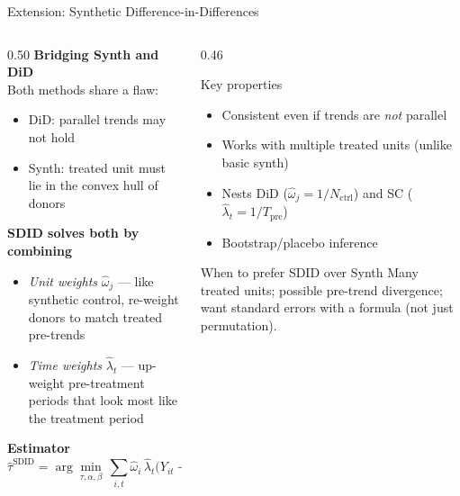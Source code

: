 \documentclass[aspectratio=169, 10pt]{beamer}
\begin{document}
\begin{frame}[shrink=10]{Extension: Synthetic Difference-in-Differences}

  \begin{columns}[T]
    \begin{column}{0.50\textwidth}
      \textbf{Bridging Synth and DiD} \citep{arkhangelsky2021}\\[4pt]
      Both methods share a flaw:
      \begin{itemize}
        \item DiD: parallel trends may not hold
        \item Synth: treated unit must lie in the convex hull of donors
      \end{itemize}

      \medskip
      \textbf{SDID solves both by combining}
      \begin{itemize}
        \item \emph{Unit weights} $\hat\omega_j$ — like synthetic control,
              re-weight donors to match treated pre-trends
        \item \emph{Time weights} $\hat\lambda_t$ — up-weight
              pre-treatment periods that look most like the treatment period
      \end{itemize}

      \medskip
      \textbf{Estimator}
      \[
        \hat\tau^{\text{SDID}} =
        \arg\min_{\tau,\alpha,\beta}\,
        \sum_{i,t} \hat\omega_i\,\hat\lambda_t
        \bigl(Y_{it} - \alpha_i - \beta_t - \tau D_{it}\bigr)^2
      \]
    \end{column}
    \begin{column}{0.46\textwidth}
      \begin{block}{Key properties}
        \begin{itemize}\small
          \item Consistent even if trends are \emph{not} parallel
          \item Works with multiple treated units (unlike basic synth)
          \item Nests DiD ($\hat\omega_j = 1/N_{\text{ctrl}}$) and SC
                ($\hat\lambda_t = 1/T_{\text{pre}}$)
          \item Bootstrap/placebo inference
        \end{itemize}
      \end{block}

      \medskip
      \begin{exampleblock}{When to prefer SDID over Synth}
        \small Many treated units; possible pre-trend divergence;
        want standard errors with a formula (not just permutation).
      \end{exampleblock}
    \end{column}
  \end{columns}

\end{frame}
\end{document}

